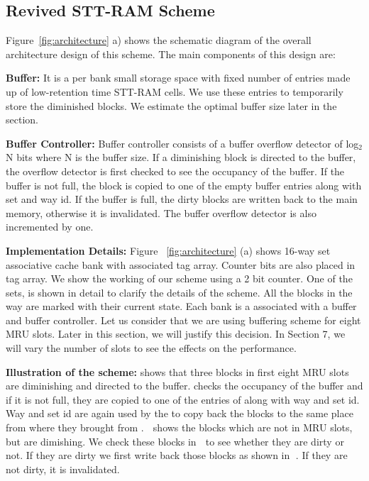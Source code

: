 
\subsection{{Revived STT-RAM Scheme}}
Figure~\ref{fig:architecture} a) shows the schematic diagram of the overall architecture design of this scheme. The main components of this design are:

\noindent\textbf{Buffer:}
It is a per bank small storage space with fixed number of entries made up of low-retention time STT-RAM cells.
We use these entries to temporarily store the diminished blocks. We estimate the optimal buffer size later in 
the section.

\noindent\textbf{Buffer Controller:}
Buffer controller consists of a buffer overflow detector of log$_2$N bits where N is the buffer size. If a diminishing block is directed to the buffer, the overflow detector
is first checked to see the occupancy of the buffer. If the buffer is not full, the block is copied to one of the empty buffer entries along with set and way id.
If the buffer is full, the dirty blocks are written back to the main memory, otherwise it is invalidated. The buffer overflow detector is also incremented by one.

\noindent\textbf{Implementation Details:}
Figure ~\ref{fig:architecture} (a) shows 16-way set associative cache bank with associated tag array. Counter bits are also placed in tag array. We show the working of
our scheme using a 2 bit counter.  One of the sets, is shown in detail to clarify the details of the scheme. All the blocks in the way are marked with their 
current state. Each bank is a associated with a buffer and buffer controller.  Let us consider that we are using buffering scheme for eight MRU slots. Later in 
this section, we will justify this decision. In Section 7, we will vary the number of slots to see the effects on the performance. 

\noindent\textbf{Illustration of the scheme:}
 shows that three blocks in first eight MRU slots are diminishing and directed to the buffer.  checks the occupancy of the buffer and if it is not full, they are copied to one of the entries of  along with way and set id. Way and set id are again used by the   to copy back the blocks to the same place from where they brought from . \textcircled{\raisebox{-.9pt}{A}} shows the blocks which are not in MRU slots, but are dimishing. We check these blocks in \textcircled{\raisebox{-.9pt}{B}}  to see whether they are dirty or not. If they are dirty we first write back those blocks as shown in \textcircled{\raisebox{-.9pt}{C}}.  If they are not dirty, it is invalidated.

